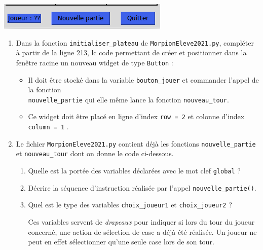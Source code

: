 \documentclass[a4paper, french, 12pt]{article}  %
\newcounter{exo}
\newcounter{exoB}
\newenvironment{exerciceB2}
{\par \bigskip  \noindent \addtocounter{exoB}{1} \hrulefill \quad { \large \textbf{Exercice \theexoB}} \quad \hrulefill \par \medskip }
{\par \bigskip }
\newcounter{act}
\begin{document}
\begin{exerciceB2}{}
 
\begin{center}
	\includegraphics[scale=0.6]{graphiques/morpion-buttons.png}
\end{center}	

\begin{enumerate}

\item Dans la fonction \lstinline+initialiser_plateau+ de \texttt{MorpionEleve2021.py}, compléter à partir de la ligne 213, lc code permettant de créer et positionner dans la fenêtre racine un nouveau  widget de type \lstinline+Button+ :

\begin{itemize}[label=\textbullet]
\item Il doit être stocké dans la variable  \lstinline+bouton_jouer+ et commander l'appel de la fonction \\ \lstinline+nouvelle_partie+ qui elle même lance la fonction \lstinline+nouveau_tour+.
\item Ce widget doit être placé en ligne d'index \lstinline+row = 2+ et colonne d'index \lstinline+column = 1+ . 
\end{itemize}

\item Le fichier \texttt{MorpionEleve2021.py} contient déjà  les fonctions \lstinline+nouvelle_partie+ et  \lstinline+nouveau_tour+ dont on donne le code ci-dessous.


\begin{enumerate}



	\item Quelle est la portée des variables déclarées avec le mot clef \lstinline+global+ ?
	\item Décrire la séquence d'instruction réalisée par l'appel \lstinline+nouvelle_partie()+.
	\item Quel est le type des variables \lstinline+choix_joueur1+ et \lstinline+choix_joueur2+ ?
	
	Ces variables servent de \textit{drapeaux}  pour indiquer si lors du tour du joueur concerné, une action de sélection de case a déjà été réalisée. Un joueur ne peut en effet sélectionner qu'une seule case lors de son tour.
	

\end{enumerate}
\end{enumerate}
\end{exerciceB2}
\end{document}
